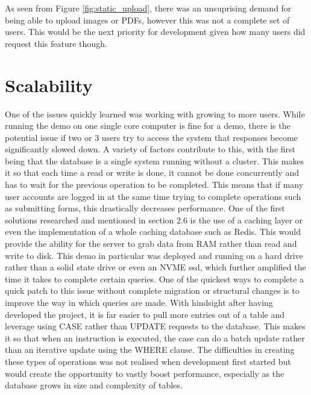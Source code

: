 As seen from Figure \ref{fig:static_upload}, there was an unsuprising demand for being able to upload images or PDFs, however this was not a complete set of users. This would be the next priority for development given how many users did request this feature though.
 
\section{Scalability}

One of the issues quickly learned was working with growing to more users. While running the demo on one single core computer is fine for a demo, there is the potential issue if two or 3 users try to access the system that responses become significantly slowed down. A variety of factors contribute to this, with the first being that the database is a single system running without a cluster.
\newline
\newline
This makes it so that each time a read or write is done, it cannot be done concurrently and has to wait for the previous operation to be completed. This means that if many user accounts are logged in at the same time trying to complete operations such as submitting forms, this drastically decreases performance. One of the first solutions researched and mentioned in section 2.6 is the use of a caching layer or even the implementation of a whole caching database such as Redis. This would provide the ability for the server to grab data from RAM rather than read and write to disk. This demo in particular was deployed and running on a hard drive rather than a solid state drive or even an NVME ssd, which further amplified the time it takes to complete certain queries.
\newline
\newline
One of the quickest ways to complete a quick patch to this issue without complete migration or structural changes is to improve the way in which queries are made. With hindsight after having developed the project, it is far easier to pull more entries out of a table and leverage using CASE rather than UPDATE requests to the database. This makes it so that when an instruction is executed, the case can do a batch update rather than an iterative update using the WHERE clause. The difficulties in creating these types of operations was not realised when development first started but would create the opportunity to vastly boost performance, especially as the database grows in size and complexity of tables.

